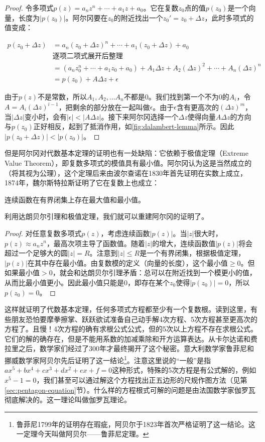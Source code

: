 \documentclass[b5paper]{ctexart}
\begin{document}
\begin{proof}
令多项式$p(z) = a_nz^n + \dotsb + a_1z + a_0$。它在复数$z_0$点的值$p(z_0)$是一个向量，长度为$|p(z_0)|$。阿尔冈要在$z_0$的附近找出一个$z_0' = z_0 + \Delta z$，此时多项式的值变成：

\begin{align*}
p(z_0 + \Delta z) &= a_n (z_0 + \Delta z)^n + \dotsb + a_1 (z_0 + \Delta z) + a_0  \\
 & \text{逐项二项式展开后整理} \\
 &= (a_n z_0^n + \dotsb + a_1 z_0 + a_0) + A_1 \Delta z + A_2 (\Delta z)^2 + \dotsb + A_n (\Delta z)^n \\
 &= p(z_0) + A \Delta z + \epsilon
\end{align*}

由于$p(z)$不是常数，所以$A_1, A_2, \dots A_n$不都是0。我们找到第一个不为0的$A_i$，令$A = A_i (\Delta z)^{i - 1}$，把剩余的部分放在一起叫做$\epsilon$。由于$\epsilon$含有更高次的$(\Delta z)^m$，当$|\Delta z|$变小时，会有$|\epsilon| < |A \Delta z|$。接下来阿尔冈选择一个$\Delta z$使得向量$A \Delta z$的方向与$p(z_0)$正好相反，起到了抵消作用，如\cref{fig:dalambert-lemma}所示。因此$|p(z_0 + \Delta z)| < |p(z_0)|$。
\end{proof}

但是阿尔冈对代数基本定理的证明也有一处缺陷：它依赖于极值定理（Extreme Value Theorem），即复数多项式的模值具有最小值。阿尔冈认为这是当然成立的（将其视为公理），这个定理后来由波尔查诺在1830年首先证明在实数上成立，1874年，魏尔斯特拉斯证明了它在复数上也成立：

\begin{theorem}[极值定理]
连续函数在有界闭集上存在最大值和最小值。
\end{theorem}

利用达朗贝尔引理和极值定理，我们就可以重建阿尔冈的证明了。

\begin{proof}
对任意复数多项式$p(z)$，考虑连续函数$|p(z)|$。当$|z|$很大时，$p(z) \approx a_n z^n$，最高次项主导了函数值。随着$|z|$的增大，连续函数值$|p(z)|$将会超过一个足够大的圆$|z| = R$。注意到$|z| \leq R$是一个有界闭集，根据极值定理，$|p(z)|$在其中存在最小值。由复数模的定义（向量的长度），这个最小值$\geq 0$。但如果最小值$> 0$，就会和达朗贝尔引理矛盾：总可以在附近找到一个模更小的值，从而比最小值更小。因此最小值只能是0，即存在某个$z_0$使得$|p(z_0)| = 0$，所以$p(z_0) = 0$。
\end{proof}

这样就证明了代数基本定理，任何多项式方程都至少有一个复数根。读到这里，有些朋友恐怕要摩拳擦掌、跃跃欲试准备自己动手解4次方程、5次方程甚至更高次的方程了。且慢！4次方程的确有求根公式公式，但的5次以上方程不存在求根公式。它们的解的确存在，但是不能用系数的加减乘除和开方运算表达。从卡尔达诺和费拉里之后，数学家们经过了300年才最终揭开了这个秘密。意大利数学家鲁菲尼和挪威数学家阿贝尔先后证明了这一结论\footnote{鲁菲尼1799年的证明存在瑕疵，阿贝尔于1823年首次严格证明了这一结论。这一定理今天叫做阿贝尔——鲁菲尼定理。}。注意这里说的“一般”是指$ax^5 + bx^4 + cx^3 + dx^2 + ex + f = 0$这种形式，特殊的5次方程是有公式解的，例如$x^5 - 1 = 0$，我们甚至可以通过解这个方程找出正五边形的尺规作图方法（见第\ref{sec:pentagon-equation}节）。什么样的方程根式可解的问题是由法国数学家伽罗瓦彻底解决的。这一理论叫做伽罗瓦理论。
\end{document}
